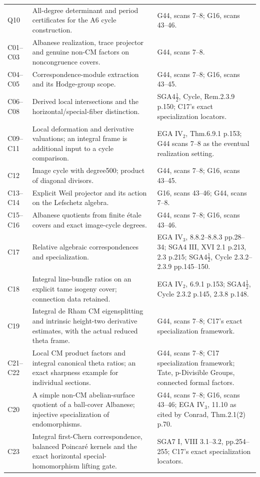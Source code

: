 \documentclass[11pt]{article}
\theoremstyle{definition}\newtheorem{definition}[theorem]{Definition}\newtheorem{remark}[theorem]{Remark}
\begin{document}
\begin{longtable}{@{}p{.18\linewidth}p{.48\linewidth}p{.27\linewidth}@{}}
Q10 & All-degree determinant and period certificates for the A6 cycle construction. & G44, scans 7--8; G16, scans 43--46.\\
C01--C03 & Albanese realization, trace projector and genuine non-CM factors on noncongruence covers. & G44, scans 7--8.\\
C04--C05 & Correspondence-module extraction and its Hodge-group scope. & G44, scans 7--8; G16, scans 43--45.\\
C06--C08 & Derived local intersections and the horizontal/special-fiber distinction. & SGA4$\frac12$, Cycle, Rem.2.3.9 p.150; C17's exact specialization locators.\\
C09--C11 & Local deformation and derivative valuations; an integral frame is additional input to a cycle comparison. & EGA IV$_2$, Thm.6.9.1 p.153; G44 scans 7--8 as the eventual realization setting.\\
C12 & Image cycle with degree500; product of diagonal divisors. & G44, scans 7--8; G16, scans 43--45.\\
C13--C14 & Explicit Weil projector and its action on the Lefschetz algebra. & G16, scans 43--46; G44, scans 7--8.\\
C15--C16 & Albanese quotients from finite \'etale covers and exact image-cycle degrees. & G44, scans 7--8; G16, scans 43--46.\\
C17 & Relative algebraic correspondences and specialization. & EGA IV$_3$, 8.8.2--8.8.3 pp.28--34; SGA4 III, XVI 2.1 p.213, 2.3 p.215; SGA4$\frac12$, Cycle 2.3.2--2.3.9 pp.145--150.\\
C18 & Integral line-bundle ratios on an explicit tame isogeny cover; connection data retained. & EGA IV$_2$, 6.9.1 p.153; SGA4$\frac12$, Cycle 2.3.2 p.145, 2.3.8 p.148.\\
C19 & Integral de Rham CM eigensplitting and intrinsic height-two derivative estimates, with the actual reduced theta frame. & G44, scans 7--8; C17's exact specialization framework.\\
C21--C22 & Local CM product factors and integral canonical theta ratios; an exact sharpness example for individual sections. & G44, scans 7--8; C17 specialization framework; Tate, p-Divisible Groups, connected formal factors.\\
C20 & A simple non-CM abelian-surface quotient of a ball-cover Albanese; injective specialization of endomorphisms. & G44, scans 7--8; G16, scans 43--46; EGA IV$_3$, 11.10 as cited by Conrad, Thm.2.1(2) p.70.\\
C23 & Integral first-Chern correspondence, balanced Poincar\'e kernels and the exact horizontal special-homomorphism lifting gate. & SGA7 I, VIII 3.1--3.2, pp.254--255; C17's exact specialization locators.\\

\end{longtable}
\end{document}
